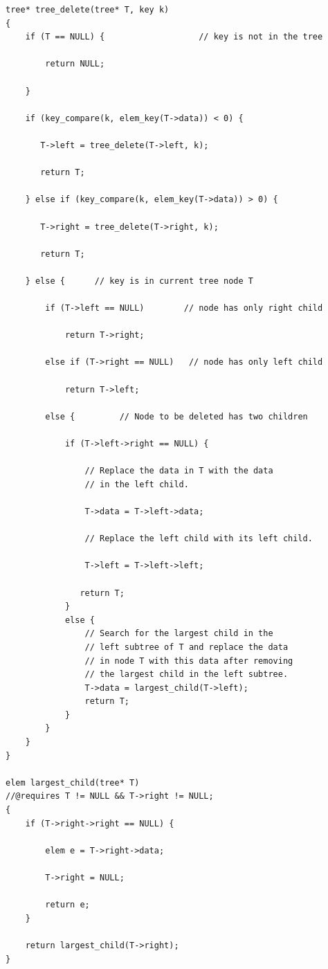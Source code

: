 \documentclass[12pt]{exam}
\begin{document}
\begin{questions}
\begin{parts}
\begin{solution}
\begin{verbatim}
tree* tree_delete(tree* T, key k)
{
    if (T == NULL) {   	               // key is not in the tree

        return NULL;

    }

    if (key_compare(k, elem_key(T->data)) < 0) {

       T->left = tree_delete(T->left, k);

       return T;

    } else if (key_compare(k, elem_key(T->data)) > 0) {

       T->right = tree_delete(T->right, k);

       return T;

    } else {      // key is in current tree node T

        if (T->left == NULL)        // node has only right child

            return T->right;

        else if (T->right == NULL)   // node has only left child

            return T->left;

        else {         // Node to be deleted has two children

            if (T->left->right == NULL) {

                // Replace the data in T with the data
                // in the left child.

                T->data = T->left->data;

                // Replace the left child with its left child.

                T->left = T->left->left;

               return T;
            }
            else {
                // Search for the largest child in the
                // left subtree of T and replace the data
                // in node T with this data after removing
                // the largest child in the left subtree.
                T->data = largest_child(T->left);
                return T;
            }
        }
    }
}

elem largest_child(tree* T)
//@requires T != NULL && T->right != NULL;
{
    if (T->right->right == NULL) {

        elem e = T->right->data;

        T->right = NULL;

        return e;
    }

    return largest_child(T->right);
}
\end{verbatim}
\end{solution}



\end{parts}



\end{questions}
\end{document}
